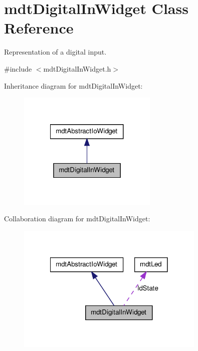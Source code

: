 \hypertarget{classmdt_digital_in_widget}{
\section{mdtDigitalInWidget Class Reference}
\label{classmdt_digital_in_widget}
}


Representation of a digital input.  




{\ttfamily \#include $<$mdtDigitalInWidget.h$>$}



Inheritance diagram for mdtDigitalInWidget:\nopagebreak
\begin{figure}[H]
\begin{center}
\leavevmode
\includegraphics[width=188pt]{classmdt_digital_in_widget__inherit__graph}
\end{center}
\end{figure}


Collaboration diagram for mdtDigitalInWidget:\nopagebreak
\begin{figure}[H]
\begin{center}
\leavevmode
\includegraphics[width=254pt]{classmdt_digital_in_widget__coll__graph}
\end{center}
\end{figure}
